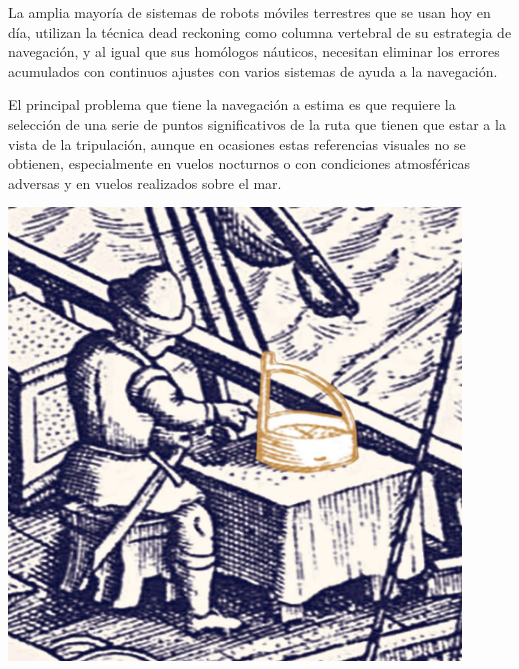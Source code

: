 \documentclass[a4paper,12pt,twoside]{article}
\begin{document}
  \begin{minipage}[b]{0.650\linewidth}
  

  La amplia mayor\'ia de sistemas de robots m\'oviles terrestres que
  se usan hoy en d\'ia, utilizan la t\'ecnica dead reckoning como
  columna vertebral de su estrategia de navegaci\'on, y al igual que
  sus hom\'ologos n\'auticos, necesitan eliminar los errores
  acumulados con continuos ajustes con varios sistemas de ayuda a la
  navegaci\'on.


  El principal problema que tiene la navegaci\'on a estima es que
  requiere la selecci\'on de una serie de puntos significativos de la
  ruta que tienen que estar
 a la vista de la tripulaci\'on, aunque en
  ocasiones estas referencias visuales no se obtienen, especialmente
  en vuelos nocturnos o con condiciones atmosf\'ericas adversas y en
  vuelos realizados sobre el mar.

\end{minipage}
\begin{minipage}[b]{0.35\linewidth}
    \centering
    
     \includegraphics[width=0.90\textwidth]{Imagenes/marinero-navegacion.jpg}
   \end{minipage}
  
\end{document}
